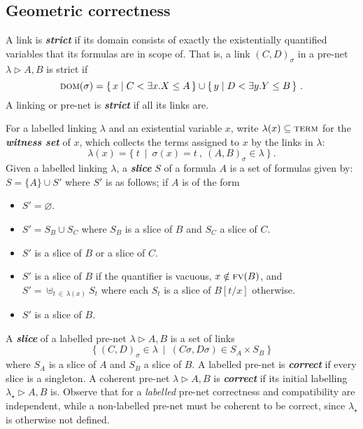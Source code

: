 \documentclass[UKenglish]{lipics-v2016}
\theoremstyle{plain}
\newcommand\defn[1]{\textit{\textbf{#1}}}
\newcommand\terms{\textsc{term}}
\newcommand\dom[1]{\textsc{dom}(#1)}
\newcommand\+{+}
\renewcommand\*{\times}
\newcommand\fv{\textsc{fv}}
\newcommand\net[3]{#1\triangleright #2,#3}
\newcommand\link[3][\sigma]{(#2,#3)_{#1}}
\begin{document}

\subsection{Geometric correctness}




A link is \defn{strict} if its domain consists of exactly the existentially quantified variables that its formulas are in scope of. That is, a link $\link CD$ in a pre-net $\net\lambda AB$ is strict if
\[
	\dom\sigma = \{\,x \mid C < \exists x.X \leq A\,\}
			\cup \{\,y \mid D < \exists y.Y \leq B\,\}~.
\]
A linking or pre-net is \defn{strict} if all its links are.



For a labelled linking $\lambda$ and an existential variable $x$, write $\lambda(x)\subseteq\terms$ for the \defn{witness set} of $x$, which collects the terms assigned to $x$ by the links in $\lambda$:
\[
	\lambda(x) = \{~t~\mid~\sigma(x) = t~,~\link AB\in\lambda~\}~.
\]
%
Given a labelled linking $\lambda$, a \defn{slice} $S$ of a formula $A$ is a set of formulas given by: $S=\{A\}\cup S'$ where $S'$ is as follows; if $A$ is of the form
%
\begin{itemize}
	\item
{}				$S'=\varnothing$.
	\item
\makebox[40pt][l]{$B\+C$:} 			$S'=S_B\cup S_C$ where $S_B$ is a slice of $B$ and $S_C$ a slice of $C$.
	\item
\makebox[40pt][l]{$B\*C$:}			$S'$ is a slice of $B$ or a slice of $C$.
	\item
{}	$S'$ is a slice of $B$ if the quantifier is vacuous, $x\notin\fv(B)$, and
	\\[\itemsep]
	\hspace*{40pt}					$S'=\uplus_{t\,\in\,\lambda(x)}S_t$ where each $S_t$ is a slice of $B[t/x]$ otherwise.
	\item
{}	$S'$ is a slice of $B$.
\end{itemize}
%
A \defn{slice} of a labelled pre-net $\net\lambda AB$ is a set of links
\[
	\{~\link CD\in \lambda~\mid~(C\sigma,D\sigma)\in S_A\times S_B~\}
\]
where $S_A$ is a slice of $A$ and $S_B$ a slice of $B$. A labelled pre-net is \defn{correct} if every slice is a singleton. A coherent pre-net $\net\lambda AB$ is \defn{correct} if its initial labelling $\net{\lambda_\star}AB$ is. Observe that for a \emph{labelled} pre-net correctness and compatibility are independent, while a non-labelled pre-net must be coherent to be correct, since $\lambda_\star$ is otherwise not defined.
\end{document}
